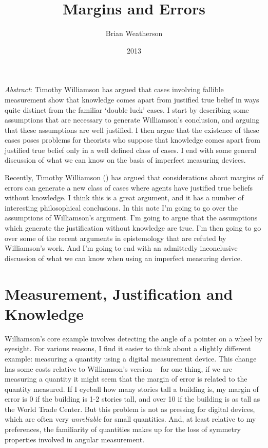 \documentclass[
  11pt,
  letterpaper,
  DIV=11,
  numbers=noendperiod,
  twoside]{scrartcl}
\title{Margins and Errors}
\author{Brian Weatherson}
\date{2013}
\renewenvironment{abstract}
 {\vspace{-1.25cm}
 \quotation\small\noindent\emph{Abstract}:}
 {\endquotation}
\renewenvironment{abstract}
 {\quotation\small\noindent\emph{Abstract}:}
 {\endquotation\vspace{-0.02cm}}
\begin{document}
\maketitle
\begin{abstract}
Timothy Williamson has argued that cases involving fallible measurement
show that knowledge comes apart from justified true belief in ways quite
distinct from the familiar `double luck' cases. I start by describing
some assumptions that are necessary to generate Williamson's conclusion,
and arguing that these assumptions are well justified. I then argue that
the existence of these cases poses problems for theorists who suppose
that knowledge comes apart from justified true belief only in a well
defined class of cases. I end with some general discussion of what we
can know on the basis of imperfect measuring devices.
\end{abstract}


Recently, Timothy Williamson ()
has argued that considerations about margins of errors can generate a
new class of cases where agents have justified true beliefs without
knowledge. I think this is a great argument, and it has a number of
interesting philosophical conclusions. In this note I'm going to go over
the assumptions of Williamson's argument. I'm going to argue that the
assumptions which generate the justification without knowledge are true.
I'm then going to go over some of the recent arguments in epistemology
that are refuted by Williamson's work. And I'm going to end with an
admittedly inconclusive discussion of what we can know when using an
imperfect measuring device.

\section{Measurement, Justification and
Knowledge}\label{measurement-justification-and-knowledge}

Williamson's core example involves detecting the angle of a pointer on a
wheel by eyesight. For various reasons, I find it easier to think about
a slightly different example: measuring a quantity using a digital
measurement device. This change has some costs relative to Williamson's
version -- for one thing, if we are measuring a quantity it might seem
that the margin of error is related to the quantity measured. If I
eyeball how many stories tall a building is, my margin of error is 0 if
the building is 1-2 stories tall, and over 10 if the building is as tall
as the World Trade Center. But this problem is not as pressing for
digital devices, which are often very \emph{unreliable} for small
quantities. And, at least relative to my preferences, the familiarity of
quantities makes up for the loss of symmetry properties involved in
angular measurement.
\end{document}
